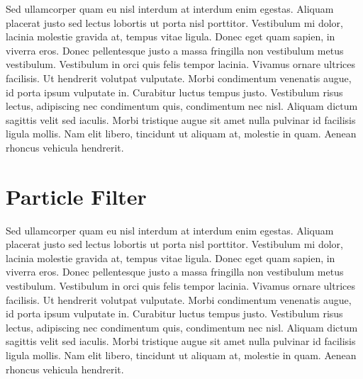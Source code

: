 Sed ullamcorper quam eu nisl interdum at interdum enim egestas. Aliquam placerat justo sed lectus lobortis ut porta nisl porttitor. Vestibulum mi dolor, lacinia molestie gravida at, tempus vitae ligula. Donec eget quam sapien, in viverra eros. Donec pellentesque justo a massa fringilla non vestibulum metus vestibulum. Vestibulum in orci quis felis tempor lacinia. Vivamus ornare ultrices facilisis. Ut hendrerit volutpat vulputate. Morbi condimentum venenatis augue, id porta ipsum vulputate in. Curabitur luctus tempus justo. Vestibulum risus lectus, adipiscing nec condimentum quis, condimentum nec nisl. Aliquam dictum sagittis velit sed iaculis. Morbi tristique augue sit amet nulla pulvinar id facilisis ligula mollis. Nam elit libero, tincidunt ut aliquam at, molestie in quam. Aenean rhoncus vehicula hendrerit.


\section{Particle Filter}

Sed ullamcorper quam eu nisl interdum at interdum enim egestas. Aliquam placerat justo sed lectus lobortis ut porta nisl porttitor. Vestibulum mi dolor, lacinia molestie gravida at, tempus vitae ligula. Donec eget quam sapien, in viverra eros. Donec pellentesque justo a massa fringilla non vestibulum metus vestibulum. Vestibulum in orci quis felis tempor lacinia. Vivamus ornare ultrices facilisis. Ut hendrerit volutpat vulputate. Morbi condimentum venenatis augue, id porta ipsum vulputate in. Curabitur luctus tempus justo. Vestibulum risus lectus, adipiscing nec condimentum quis, condimentum nec nisl. Aliquam dictum sagittis velit sed iaculis. Morbi tristique augue sit amet nulla pulvinar id facilisis ligula mollis. Nam elit libero, tincidunt ut aliquam at, molestie in quam. Aenean rhoncus vehicula hendrerit.